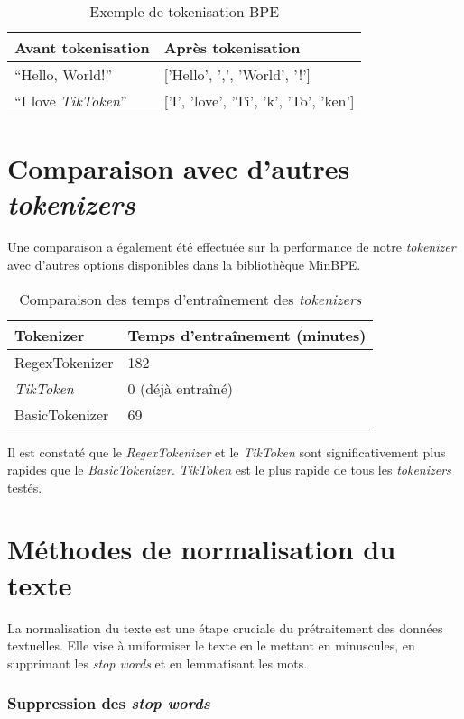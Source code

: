 \begin{table}[h]
\centering
\begin{tabular}{|l|l|}
\hline
\textbf{Avant tokenisation} & \textbf{Après tokenisation} \\ \hline
``Hello, World!'' & ['Hello', ',', 'World', '!'] \\ \hline
``I love \textit{TikToken}'' & ['I', 'love', 'Ti', 'k', 'To', 'ken'] \\ \hline
\end{tabular}
\caption{Exemple de tokenisation BPE}
\end{table}

\section{Comparaison avec d'autres \textit{tokenizers}}

Une comparaison a également été effectuée sur la performance de notre \textit{tokenizer} avec d'autres options disponibles dans la bibliothèque MinBPE.

\begin{table}[h]
\centering
\begin{tabular}{|l|l|}
\hline
\textbf{Tokenizer} & \textbf{Temps d'entraînement (minutes)} \\ \hline
RegexTokenizer & 182 \\ \hline
\textit{TikToken} & 0 (déjà entraîné) \\ \hline
BasicTokenizer & 69 \\ \hline
\end{tabular}
\caption{Comparaison des temps d'entraînement des \textit{tokenizers}}
\end{table}


Il est constaté que le \textit{RegexTokenizer} et le \textit{TikToken} sont significativement plus rapides que le \textit{BasicTokenizer}. \textit{TikToken} est le plus rapide de tous les \textit{tokenizers} testés.

\section{Méthodes de normalisation du texte}
La normalisation du texte est une étape cruciale du prétraitement des données textuelles. Elle vise à uniformiser le texte en le mettant en minuscules, en supprimant les \textit{stop words} et en lemmatisant les mots.

\subsubsection*{Suppression des \textit{stop words}}


